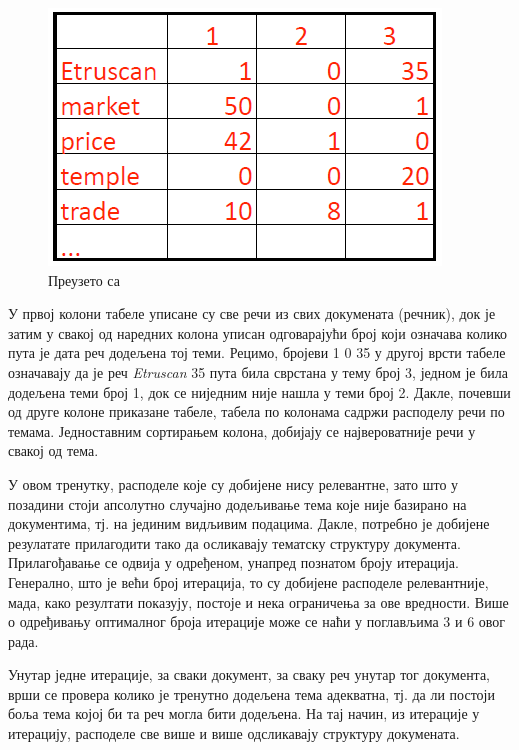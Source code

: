 \begin{figure}[H]
    \centering
   \includegraphics[scale=0.6]{./Slike/slika6.png} 
	\caption{Преузето са \cite{mimno1}}
	\label{fig:slika6}
\end{figure}
У првој колони табеле уписане су све речи из свих докумената (речник), док је затим у свакој од наредних колона уписан одговарајући број који означава колико пута је дата реч додељена тој теми. Рецимо, бројеви 1 0 35 у другој врсти табеле означавају да је реч \textit{Etruscan} 35 пута била сврстана у тему број 3, једном је била додељена теми број 1, док се ниједним није нашла у теми број 2.
Дакле, почевши од друге колоне приказане табеле, табела по колонама садржи расподелу речи по темама. Једноставним сортирањем колона, добијају се највероватније речи у свакој од тема.

У овом тренутку, расподеле које су добијене нису релевантне, зато што у позадини стоји апсолутно случајно додељивање тема које није базирано на документима, тј. на јединим видљивим подацима.
Дакле, потребно је добијене резулатате прилагодити тако да осликавају тематску структуру документа. Прилагођавање се одвија у одређеном, унапред познатом броју итерација. Генерално, што је већи број итерација, то су добијене расподеле релевантније, мада, како резултати показују, постоје и нека ограничења за ове вредности. Више о одређивању оптималног броја итерације може се наћи у поглављима 3 и 6 овог рада.

Унутар једне итерације, за сваки документ, за сваку реч унутар тог документа, врши се провера колико је тренутно додељена тема адекватна, тј. да ли постоји боља тема којој би та реч могла бити додељена. На тај начин, из итерације у итерацију, расподеле све више и више одсликавају структуру докумената.

